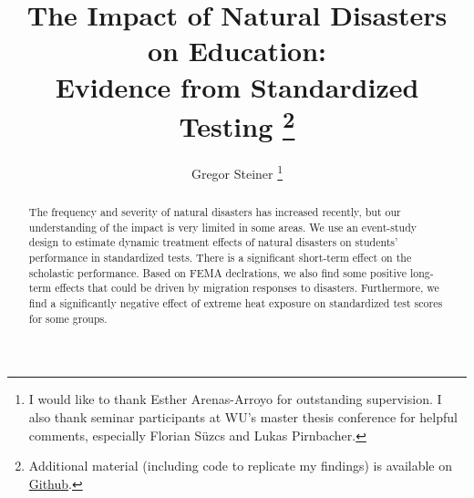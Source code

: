 \documentclass[11pt]{article}
\title{The Impact of Natural Disasters on Education: \\ Evidence from Standardized Testing \thanks{Additional material (including code to replicate my findings) is available on \href{https://github.com/gregorsteiner/MasterThesis}{Github}.}}
\author{Gregor Steiner \thanks{I would like to thank Esther Arenas-Arroyo for outstanding supervision. I also thank seminar participants at WU's master thesis conference for helpful comments, especially Florian Süzcs and Lukas Pirnbacher.}}
\begin{document}
\maketitle
{}

\begin{abstract}
	\centering
	\begin{minipage}{\dimexpr\paperwidth-10cm}
		The frequency and severity of natural disasters has increased recently, but our understanding of the impact is very limited in some areas. We use an event-study design to estimate dynamic treatment effects of natural disasters on students' performance in standardized tests. There is a significant short-term effect on the scholastic performance. Based on FEMA declrations, we also find some positive long-term effects that could be driven by migration responses to disasters. Furthermore, we find a significantly negative effect of extreme heat exposure on standardized test scores for some groups.
	\end{minipage}
\end{abstract}

\newpage
\tableofcontents

\newpage












\appendix





\end{document}
